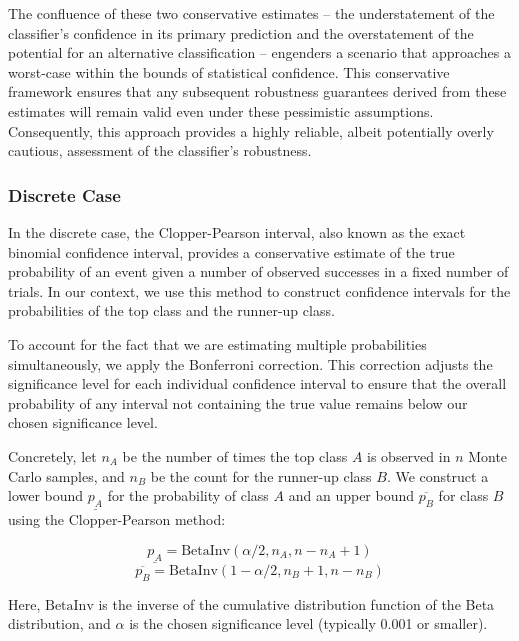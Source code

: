 The confluence of these two conservative estimates – the understatement of the classifier's confidence in its primary prediction and the overstatement of the potential for an alternative classification – engenders a scenario that approaches a worst-case within the bounds of statistical confidence.
This conservative framework ensures that any subsequent robustness guarantees derived from these estimates will remain valid even under these pessimistic assumptions.
Consequently, this approach provides a highly reliable, albeit potentially overly cautious, assessment of the classifier's robustness.

\subsubsection{Discrete Case}\label{subsubsec:discrete-case}
In the discrete case, the Clopper-Pearson interval, also known as the exact binomial confidence interval, provides a conservative estimate of the true probability of an event given a number of observed successes in a fixed number of trials.
In our context, we use this method to construct confidence intervals for the probabilities of the top class and the runner-up class.

To account for the fact that we are estimating multiple probabilities simultaneously, we apply the Bonferroni correction.
This correction adjusts the significance level for each individual confidence interval to ensure that the overall probability of any interval not containing the true value remains below our chosen significance level.

Concretely, let $n_A$ be the number of times the top class $A$ is observed in $n$ Monte Carlo samples, and $n_B$ be the count for the runner-up class $B$.
We construct a lower bound $\underline{p_A}$ for the probability of class $A$ and an upper bound $\overline{p_B}$ for class $B$ using the Clopper-Pearson method:

\begin{equation}
    \underline{p_A} = \text{BetaInv}(\alpha/2, n_A, n - n_A + 1)
\end{equation}
\begin{equation}
    \overline{p_B} = \text{BetaInv}(1-\alpha/2, n_B + 1, n - n_B)
\end{equation}

Here, $\text{BetaInv}$ is the inverse of the cumulative distribution function of the Beta distribution, and $\alpha$ is the chosen significance level (typically 0.001 or smaller).

